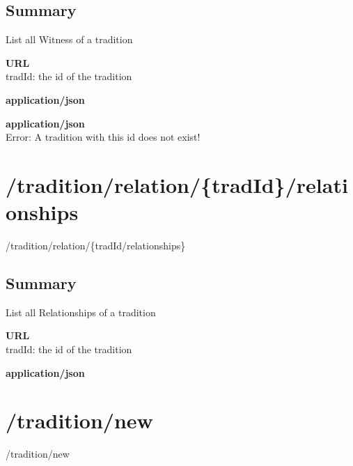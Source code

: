 \documentclass[11pt,fleqn,openany]{book} %
\begin{document}
\subsection*{Summary}
List all Witness of a tradition
\begin{parameter}\textbf{URL}\\
tradId: the id of the tradition \\
\end{parameter}
\begin{return}[OK]
\textbf{application/json}\\

\end{return}
\begin{return}
\textbf{application/json}\\
Error: A tradition with this id does not exist!
\end{return}

\section{/tradition/relation/\{tradId\}/relationships}
\begin{get}
/tradition/relation/\{tradId/relationships\}
\end{get}

\subsection*{Summary}
List all Relationships of a tradition
\begin{parameter}\textbf{URL}\\
tradId: the id of the tradition \\
\end{parameter}
\begin{return}[OK]
\textbf{application/json}\\
\end{return}

\section{/tradition/new}
\begin{post}
/tradition/new
\end{post}
\end{document}
